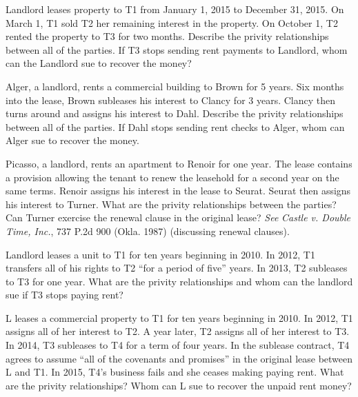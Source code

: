 
\item Landlord leases property to T1 from January 1, 2015 to December 31, 2015. 
On March 1, T1 sold T2 her remaining interest in the property.  On October 1,
T2 rented the property to T3 for two months.  Describe the privity
relationships between all of the parties.  If T3 stops sending rent payments to
Landlord, whom can the Landlord sue to recover the money? 


\item Alger, a landlord, rents a commercial building to Brown for 5 years.  Six
months into the lease, Brown subleases his interest to Clancy for 3 years. 
Clancy then turns around and assigns his interest to Dahl.  Describe the
privity relationships between all of the parties.  If Dahl stops sending rent
checks to Alger, whom can Alger sue to recover the money.


\item Picasso, a landlord, rents an apartment to Renoir for one year.  The lease
contains a provision allowing the tenant to renew the leasehold for a second
year on the same terms.  Renoir assigns his interest in the lease to Seurat. 
Seurat then assigns his interest to Turner.  What are the privity relationships
between the parties? Can Turner exercise the renewal clause in the original
lease? \textit{See} \textit{Castle v. Double Time, Inc.}, 737 P.2d 900 (Okla.
1987) (discussing renewal clauses). 


\item Landlord leases a unit to T1 for ten years beginning in 2010.  In 2012, T1
transfers all of his rights to T2 ``for a period of five'' years.  In 2013, T2
subleases to T3 for one year.  What are the privity relationships and whom can
the landlord sue if T3 stops paying rent?


\item L leases a commercial property to T1 for ten years beginning in 2010.  In
2012, T1 assigns all of her interest to T2.  A year later, T2 assigns all of
her interest to T3.  In 2014, T3 subleases to T4 for a term of four years.  In
the sublease contract, T4 agrees to assume ``all of the covenants and
promises'' in the original lease between L and T1.  In 2015, T4's business
fails and she ceases making paying rent.  What are the privity relationships? 
Whom can L sue to recover the unpaid rent money?  

